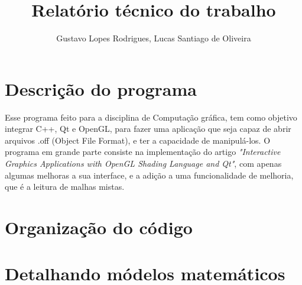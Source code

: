 \documentclass{ol-softwaremanual}
\title{Relatório técnico do trabalho }
\author{Gustavo Lopes Rodrigues, Lucas Santiago de Oliveira}
\begin{document}
\maketitle

\tableofcontents
\newpage

\section{Descrição do programa}

Esse programa feito para a disciplina de Computação gráfica, tem como objetivo integrar
C++, Qt e OpenGL, para fazer uma aplicação que seja capaz de abrir arquivos .off (Object File Format),
e ter a capacidade de manipulá-los. O programa em grande parte consiste na implementação do artigo 
\emph{"Interactive Graphics Applications with OpenGL Shading Language and Qt"}, com apenas algumas 
melhoras a sua interface, e a adição a uma funcionalidade de melhoria, que é a leitura de malhas
mistas.

\section{Organização do código}

\section{Detalhando módelos matemáticos}
\end{document}
